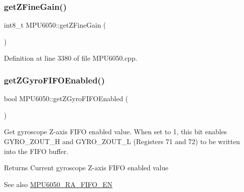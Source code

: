 \subsubsection{\texorpdfstring{getZFineGain()}{getZFineGain()}}
{\footnotesize\ttfamily int8\+\_\+t M\+P\+U6050\+::get\+Z\+Fine\+Gain (\begin{DoxyParamCaption}{ }\end{DoxyParamCaption})}



Definition at line 3380 of file M\+P\+U6050.\+cpp.


\begin{DoxyCode}{0}

\end{DoxyCode}
\mbox{\label{classMPU6050_adbbbd131c74f37dd545403633eb317ff}} 
\subsubsection{\texorpdfstring{getZGyroFIFOEnabled()}{getZGyroFIFOEnabled()}}
{\footnotesize\ttfamily bool M\+P\+U6050\+::get\+Z\+Gyro\+F\+I\+F\+O\+Enabled (\begin{DoxyParamCaption}{ }\end{DoxyParamCaption})}

Get gyroscope Z-\/axis F\+I\+FO enabled value. When set to 1, this bit enables G\+Y\+R\+O\+\_\+\+Z\+O\+U\+T\+\_\+H and G\+Y\+R\+O\+\_\+\+Z\+O\+U\+T\+\_\+L (Registers 71 and 72) to be written into the F\+I\+FO buffer. \begin{DoxyReturn}{Returns}
Current gyroscope Z-\/axis F\+I\+FO enabled value 
\end{DoxyReturn}
\begin{DoxySeeAlso}{See also}
\mbox{\hyperlink{MPU6050_8h_a1166fe50f4792f3266e15dc3273e375d}{M\+P\+U6050\+\_\+\+R\+A\+\_\+\+F\+I\+F\+O\+\_\+\+EN}} 
\end{DoxySeeAlso}


